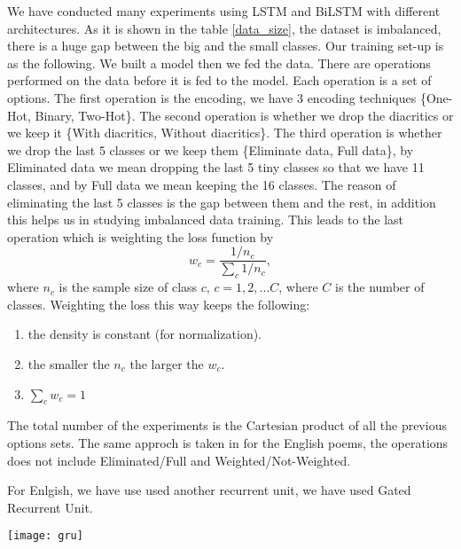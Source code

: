 \documentclass[12pt]{report}
\begin{document}
We have conducted many experiments using LSTM and BiLSTM with
different architectures. As it is shown in the table \ref{data_size}, the dataset
is imbalanced, there is a huge gap between the big and the small classes.
Our training set-up is as the following. We built a model then
we fed the data.  There are operations performed on the data before it is fed to
the model.  Each operation is a set of options. The first operation is the
encoding, we have 3 encoding techniques \{One-Hot, Binary, Two-Hot\}. The
second operation is whether we drop the diacritics or we keep it \{With
diacritics, Without diacritics\}. The third operation is whether we drop the
last 5 classes or we keep them \{Eliminate data, Full data\}, by
Eliminated data we mean dropping the last 5 tiny classes so that we have 11
classes, and by Full data we mean keeping the 16 classes.
The reason of eliminating the last 5 classes is the gap between them and the
rest, in addition this helps us in studying imbalanced data training. This
leads to the last operation which is weighting the loss function by%
\[w_c = \frac{1/n_c}{\sum\limits_{c}1/n_c},\]%
where $n_c$ is the sample size of class $c$, $c = 1, 2, ... C$, where $C$ is the number of classes.  Weighting the loss this way keeps the following:
\begin{enumerate}
  \item the density is constant (for normalization).
  \item the smaller the $n_c$ the larger the $w_c$.
  \item $\sum\limits_{c} w_c = 1$
\end{enumerate}
The total number of the experiments is the Cartesian product of all the previous
options sets. The same approch is taken in for the English poems, the operations
does not include Eliminated/Full and Weighted/Not-Weighted.

For Enlgish, we have use used another recurrent unit, we have used
Gated Recurrent Unit.

\texttt{[image: gru]}






















\end{document}
